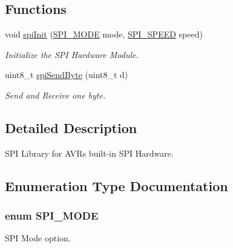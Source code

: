 \subsection*{Functions}
\begin{DoxyCompactItemize}
\item 
void \hyperlink{group__spi_gab16bbe73b15109ae6ca700391711d036}{spi\-Init} (\hyperlink{group__spi_gae506139af46f1328f631ddacd54af96d}{S\-P\-I\-\_\-\-M\-O\-D\-E} mode, \hyperlink{group__spi_ga92b13fd51af2a9a09b1854520a5a427f}{S\-P\-I\-\_\-\-S\-P\-E\-E\-D} speed)
\begin{DoxyCompactList}\small\item\em Initialize the S\-P\-I Hardware Module. \end{DoxyCompactList}\item 
uint8\-\_\-t \hyperlink{group__spi_ga0ba99d77c04fac21eff9c6ee91b60d43}{spi\-Send\-Byte} (uint8\-\_\-t d)
\begin{DoxyCompactList}\small\item\em Send and Receive one byte. \end{DoxyCompactList}\end{DoxyCompactItemize}


\subsection{Detailed Description}
S\-P\-I Library for A\-V\-Rs built-\/in S\-P\-I Hardware. 

\subsection{Enumeration Type Documentation}
\hypertarget{group__spi_gae506139af46f1328f631ddacd54af96d}{
\subsubsection[{S\-P\-I\-\_\-\-M\-O\-D\-E}]{\setlength{\rightskip}{0pt plus 5cm}enum {\bf S\-P\-I\-\_\-\-M\-O\-D\-E}}}\label{group__spi_gae506139af46f1328f631ddacd54af96d}


S\-P\-I Mode option. 

